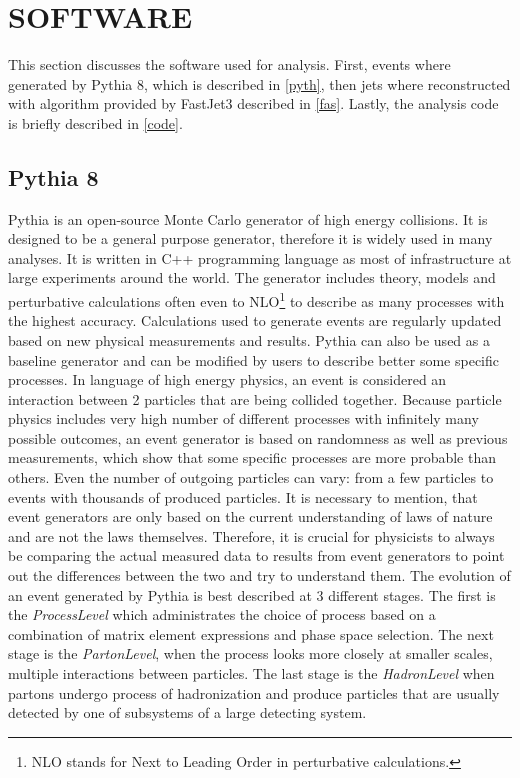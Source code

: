 \documentclass[a4paper,10pt]{article}
\begin{document}
\section{SOFTWARE}
\label{soft}
This section discusses the software used for analysis. First, events where generated by Pythia 8, which is described in \autoref{pyth}, then jets where reconstructed with algorithm provided by FastJet3 described in \autoref{fas}. Lastly, the analysis code is briefly described in \autoref{code}.

\subsection{Pythia 8}
\label{pyth}
Pythia\cite{PythiaPythia} is an open-source Monte Carlo generator of high energy collisions. It is designed to be a general purpose generator, therefore it is widely used in many analyses. It is written in C++ programming language as most of infrastructure at large experiments around the world. The generator includes theory, models and perturbative calculations often even to NLO\footnote{NLO stands for Next to Leading Order in perturbative calculations.} to describe as many processes with the highest accuracy\cite{pythiaSjostrand}. Calculations used to generate events are regularly updated based on new physical measurements and results. Pythia can also be used as a baseline generator and can be modified by users to describe better some specific processes. 
\newline
\noindent In language of high energy physics, an event is considered an interaction between 2 particles that are being collided together. Because particle physics includes very high number of different processes with infinitely many possible outcomes, an event generator is based on randomness as well as previous measurements, which show that some specific processes are more probable than others\cite{Pythia2022comprehensive}. Even the number of outgoing particles can vary: from a few particles to events with thousands of produced particles. It is necessary to mention, that event generators are only based on the current understanding of laws of nature and are not the laws themselves. Therefore, it is crucial for physicists to always be comparing the actual measured data to results from event generators to point out the differences between the two and try to understand them.
\newline
\noindent The evolution of an event generated by Pythia is best described at 3 different stages. The first is the \textit{ProcessLevel} which administrates the choice of process based on a combination of matrix element expressions and phase space selection\cite{pythiaSjostrand}. The next stage is the \textit{PartonLevel}, when the process looks more closely at smaller scales, multiple interactions between particles. The last stage is the \textit{HadronLevel} when partons undergo process of hadronization and produce particles that are usually detected by one of subsystems of a large detecting system.
\end{document}
